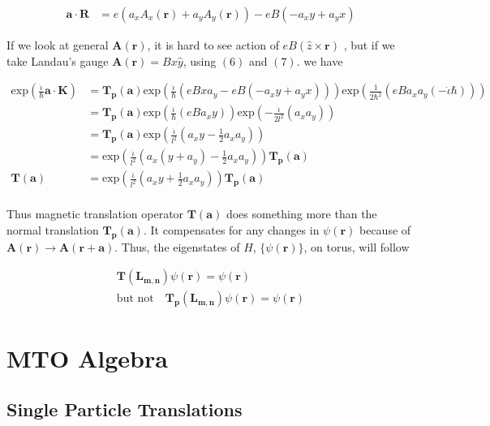 \documentclass[11pt,a4paper,notitlepage]{article}
\newcommand{\bsym}{\boldsymbol}
\newcommand{\nexp}[1]{\text{exp}\left( #1 \right)}
\newcommand{\niota}{\dot{\iota}}
\newcommand{\req}[1]{\text{eq}$( #1 )$}
\newcommand{\tnorm}[1]{\bsym{T}_{\bsym{p}}(\bsym{#1})}
\newcommand{\tmag}[1]{\bsym{T}(\bsym{#1})}
\begin{document}
    		\begin{align}
    			\bsym{a}\cdot\bsym{R} &= e(a_{x}A_{x}(\bsym{r})+a_{y}A_{y}(\bsym{r}))-eB(-a_{x}y+a_{y}x)
    		\end{align}
    		
    		If we look at general $\bsym{A}(\bsym{r})$, it is hard to see action of $eB(\hat{z} \times \bsym{r})$ , but if we take Landau's gauge $\bsym{A}(\bsym{r}) = Bx\hat{y}$, using \req{6} and \req{7}. we have
    		
    		\begin{align*}
    			\nexp{\frac{\niota}{\hbar}\bsym{a} \cdot \bsym{K}} &= \tnorm{a} \nexp{\frac{\niota}{\hbar}(eBxa_{y}-eB(-a_{x}y+a_{y}x))} \nexp{\frac{1}{2\hbar^{2}}(eBa_{x}a_{y}(-\niota\hbar))} \\
    			&= \tnorm{a} \nexp{\frac{\niota}{\hbar}(eBa_{x}y)} \nexp{-\frac{\niota}{2l^{2}}(a_{x}a_{y})} \\
    			&= \tnorm{a} \nexp{\frac{\niota}{l^{2}}(a_{x}y-\frac{1}{2}a_{x}a_{y})}  \\
    			&=  \nexp{\frac{\niota}{l^{2}}(a_{x}(y+a_y)-\frac{1}{2}a_{x}a_{y})}\tnorm{a}  \\
    			\tmag{a} &=  \nexp{\frac{\niota}{l^{2}}(a_{x}y+\frac{1}{2}a_{x}a_{y})}\tnorm{a}  \\
    		\end{align*}
    		
    		Thus magnetic translation operator $\tmag{a}$ does something more than the normal translation $\tnorm{a}$. It compensates for any changes in $\psi(\bsym{r})$ because of $\bsym{A}(\bsym{r})\rightarrow \bsym{A}(\bsym{r}+\bsym{a})$. Thus, the eigenstates of $H$, $\{\psi(\bsym{r})\}$, on torus, will follow
    		
    		\begin{align*}
    			\tmag{\bsym{L_{m,n}}}\psi(\bsym{r}) = \psi(\bsym{r})\\
    			\text{but not}\quad \tnorm{\bsym{L_{m,n}}}\psi(\bsym{r}) = \psi(\bsym{r})
    		\end{align*}
    		
    		\section{MTO Algebra}
                \hrulefill
                
    		\subsection{Single Particle Translations}
    		
\end{document}
